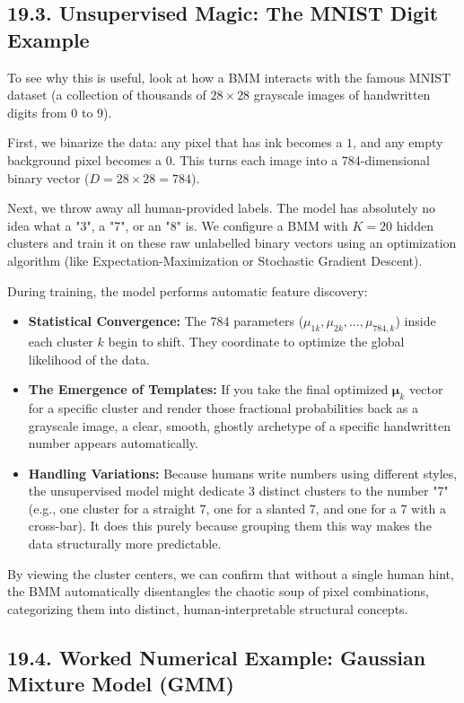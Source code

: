 \documentclass{article}
\begin{document}
\subsection*{19.3. Unsupervised Magic: The MNIST Digit Example}
To see why this is useful, look at how a BMM interacts with the famous MNIST dataset (a collection of thousands of $28 \times 28$ grayscale images of handwritten digits from $0$ to $9$). 

First, we binarize the data: any pixel that has ink becomes a $1$, and any empty background pixel becomes a $0$. This turns each image into a 784-dimensional binary vector ($D = 28 \times 28 = 784$).

Next, we throw away all human-provided labels. The model has absolutely no idea what a "3", a "7", or an "8" is. We configure a BMM with $K = 20$ hidden clusters and train it on these raw unlabelled binary vectors using an optimization algorithm (like Expectation-Maximization or Stochastic Gradient Descent). 

During training, the model performs automatic feature discovery:
\begin{itemize}
    \item \textbf{Statistical Convergence:} The 784 parameters ($\mu_{1k}, \mu_{2k}, \dots, \mu_{784,k}$) inside each cluster $k$ begin to shift. They coordinate to optimize the global likelihood of the data.
    \item \textbf{The Emergence of Templates:} If you take the final optimized $\boldsymbol{\mu}_k$ vector for a specific cluster and render those fractional probabilities back as a grayscale image, a clear, smooth, ghostly archetype of a specific handwritten number appears automatically. 
    \item \textbf{Handling Variations:} Because humans write numbers using different styles, the unsupervised model might dedicate 3 distinct clusters to the number "7" (e.g., one cluster for a straight 7, one for a slanted 7, and one for a 7 with a cross-bar). It does this purely because grouping them this way makes the data structurally more predictable.
\end{itemize}

By viewing the cluster centers, we can confirm that without a single human hint, the BMM automatically disentangles the chaotic soup of pixel combinations, categorizing them into distinct, human-interpretable structural concepts.

\subsection*{19.4. Worked Numerical Example: Gaussian Mixture Model (GMM)}
\end{document}
